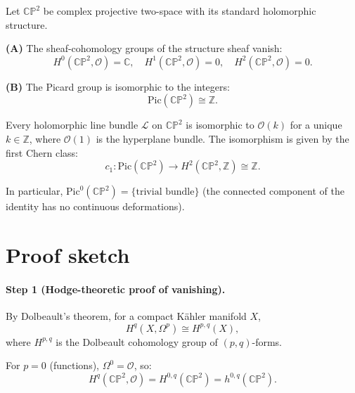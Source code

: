 \begin{theorem}
\label{thm:main}
Let $\mathbb{CP}^2$ be complex projective two-space with its standard
holomorphic structure.

\noindent
{\bf (A)} The sheaf-cohomology groups of the structure sheaf vanish:
\begin{equation}
H^0(\mathbb{CP}^2, \mathcal{O}) = \mathbb{C}, \quad H^1(\mathbb{CP}^2, \mathcal{O}) = 0,
\quad H^2(\mathbb{CP}^2, \mathcal{O}) = 0.
\end{equation}

\noindent
{\bf (B)} The Picard group is isomorphic to the integers:
\begin{equation}
\boxed{\mathrm{Pic}(\mathbb{CP}^2) \cong \mathbb{Z}.}
\end{equation}

Every holomorphic line bundle $\mathcal{L}$ on $\mathbb{CP}^2$ is isomorphic to
$\mathcal{O}(k)$ for a unique $k \in \mathbb{Z}$, where $\mathcal{O}(1)$ is the
hyperplane bundle. The isomorphism is given by the first Chern class:
\begin{equation}
c_1 : \mathrm{Pic}(\mathbb{CP}^2) \to H^2(\mathbb{CP}^2, \mathbb{Z}) \cong \mathbb{Z}.
\end{equation}

In particular, $\mathrm{Pic}^0(\mathbb{CP}^2) = \{\text{trivial bundle}\}$ (the
connected component of the identity has no continuous deformations).
\end{theorem}

\section{Proof sketch}

\paragraph{Step 1 (Hodge-theoretic proof of vanishing).}
By Dolbeault's theorem, for a compact Kähler manifold $X$,
\begin{equation}
H^q(X, \Omega^p) \cong H^{p,q}(X),
\end{equation}
where $H^{p,q}$ is the Dolbeault cohomology group of $(p,q)$-forms.

For $p = 0$ (functions), $\Omega^0 = \mathcal{O}$, so:
\begin{equation}
H^q(\mathbb{CP}^2, \mathcal{O}) = H^{0,q}(\mathbb{CP}^2) = h^{0,q}(\mathbb{CP}^2).
\end{equation}

